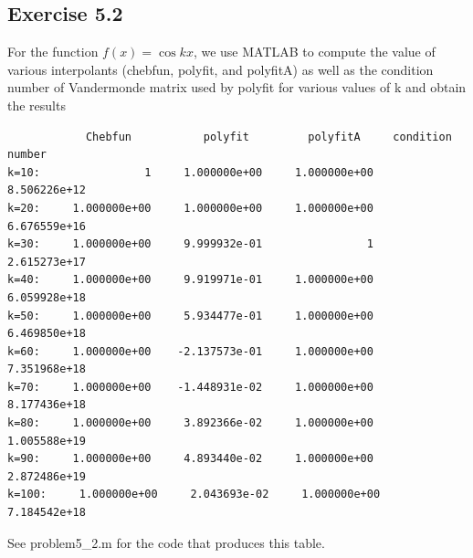 \documentclass{article}
\begin{document}
\subsection{Exercise 5.2}
For the function $f(x)=\cos{kx}$, we use MATLAB to compute the value of various interpolants (chebfun, polyfit, and polyfitA) as well as the condition number of Vandermonde matrix used by polyfit for various values of k and obtain the results
\begin{verbatim}
            Chebfun           polyfit         polyfitA     condition number
k=10:                1     1.000000e+00     1.000000e+00     8.506226e+12
k=20:     1.000000e+00     1.000000e+00     1.000000e+00     6.676559e+16
k=30:     1.000000e+00     9.999932e-01                1     2.615273e+17
k=40:     1.000000e+00     9.919971e-01     1.000000e+00     6.059928e+18
k=50:     1.000000e+00     5.934477e-01     1.000000e+00     6.469850e+18
k=60:     1.000000e+00    -2.137573e-01     1.000000e+00     7.351968e+18
k=70:     1.000000e+00    -1.448931e-02     1.000000e+00     8.177436e+18
k=80:     1.000000e+00     3.892366e-02     1.000000e+00     1.005588e+19
k=90:     1.000000e+00     4.893440e-02     1.000000e+00     2.872486e+19
k=100:     1.000000e+00     2.043693e-02     1.000000e+00     7.184542e+18
\end{verbatim}
See problem5\_2.m for the code that produces this table.
\end{document}
